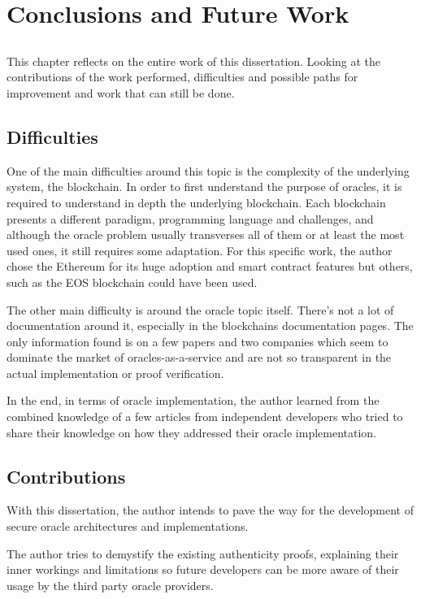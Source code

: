 \chapter{Conclusions and Future Work} \label{chap:concl}

\section*{}

This chapter reflects on the entire work of this dissertation. Looking at the contributions of the work performed, difficulties and possible paths for improvement and work that can still be done.

\section{Difficulties}
One of the main difficulties around this topic is the complexity of the underlying system, the blockchain. In order to first understand the purpose of oracles, it is required to understand in depth the underlying blockchain. Each blockchain presents a different paradigm, programming language and challenges, and although the oracle problem usually transverses all of them or at least the most used ones, it still requires some adaptation. For this specific work, the author chose the Ethereum for its huge adoption and smart contract features but others, such as the EOS blockchain could have been used.

The other main difficulty is around the oracle topic itself. There's not a lot of documentation around it, especially in the blockchains documentation pages. The only information found is on a few papers and two companies which seem to dominate the market of oracles-as-a-service and are not so transparent in the actual implementation or proof verification.

In the end, in terms of oracle implementation, the author learned from the combined knowledge of a few articles from independent developers who tried to share their knowledge on how they addressed their oracle implementation.

\section{Contributions}
With this dissertation, the author intends to pave the way for the development of secure oracle architectures and implementations.

The author tries to demystify the existing authenticity proofs, explaining their inner workings and limitations so future developers can be more aware of their usage by the third party oracle providers.

